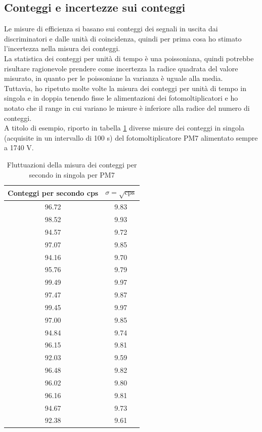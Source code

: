 \documentclass{article}
\begin{document}
\subsection{Conteggi e incertezze sui conteggi}
Le misure di efficienza si basano sui conteggi dei segnali in uscita dai discriminatori e dalle unità di coincidenza, quindi per prima cosa ho stimato l'incertezza nella misura dei conteggi. 
\\
La statistica dei conteggi per unità di tempo è una poissoniana, quindi potrebbe risultare ragionevole prendere come incertezza la radice quadrata del valore misurato, in quanto per le poissoniane la varianza è uguale alla media. 
\\
Tuttavia, ho ripetuto molte volte la misura dei conteggi per unità di tempo in singola e in doppia tenendo fisse le alimentazioni dei fotomoltiplicatori e ho notato che il range in cui variano le misure è inferiore alla radice del numero di conteggi. \\
A titolo di esempio, riporto in tabella \ref{errcont} diverse misure dei conteggi in singola (acquisite in un intervallo di 100 s) del fotomoltiplicatore PM7 alimentato sempre a 1740 V. 

\begin{table}[h!]
\centering
\begin{tabular}{|c|c|}
\hline
Conteggi per secondo cps & $\sigma =\sqrt{\text{cps}}$ \\ 
 \hline
\hline 
96.72 &  9.83 \\ 
\hline 
98.52 &  9.93 \\ 
\hline 
94.57 &  9.72 \\ 
\hline 
97.07 &  9.85 \\ 
\hline 
94.16 &  9.70 \\ 
\hline 
95.76 &  9.79 \\ 
\hline 
99.49 &  9.97 \\ 
\hline 
97.47 &  9.87 \\ 
\hline 
99.45 &  9.97 \\ 
\hline 
97.00 &  9.85 \\ 
\hline 
94.84 &  9.74 \\ 
\hline 
96.15 &  9.81 \\ 
\hline 
92.03 &  9.59 \\ 
\hline 
96.48 &  9.82 \\ 
\hline 
96.02 &  9.80 \\ 
\hline 
96.16 &  9.81 \\ 
\hline 
94.67 &  9.73 \\ 
\hline 
92.38 &  9.61 \\ 
\hline 
\end{tabular}
\caption{Fluttuazioni della misura dei conteggi per secondo in singola per PM7}\label{errcont}
\end{table}
\end{document}
